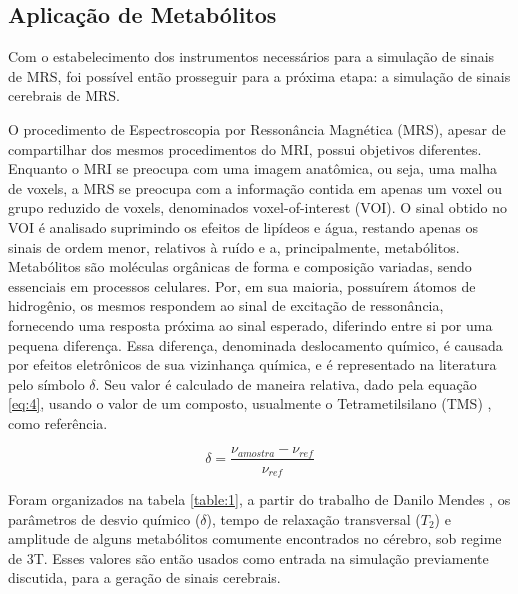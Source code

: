 \documentclass{article}
\begin{document}
\subsection{Aplicação de Metabólitos}

Com o estabelecimento dos instrumentos necessários para a simulação de sinais de MRS, foi possível então prosseguir para a próxima etapa:
a simulação de sinais cerebrais de MRS.

O procedimento de Espectroscopia por Ressonância Magnética (MRS), apesar de compartilhar dos mesmos procedimentos do MRI, possui objetivos 
diferentes. Enquanto o MRI se preocupa com uma imagem anatômica, ou seja, uma malha de voxels, a MRS se preocupa com a informação contida em apenas um voxel ou grupo 
reduzido de voxels, denominados voxel-of-interest (VOI). O sinal obtido no VOI é analisado suprimindo os efeitos de lipídeos e água, restando 
apenas os sinais de ordem menor, relativos à ruído e a, principalmente, metabólitos. Metabólitos são moléculas orgânicas de forma e composição 
variadas, sendo essenciais em processos celulares. Por, em sua maioria, possuírem átomos de hidrogênio, os mesmos respondem ao sinal de excitação 
de ressonância, fornecendo uma resposta próxima ao sinal esperado, diferindo entre si por uma pequena diferença. Essa diferença, denominada deslocamento químico, 
é causada por efeitos eletrônicos de sua vizinhança química, e é representado na literatura pelo símbolo $\delta$. Seu valor é calculado de maneira 
relativa, dado pela equação \ref{eq:4}, usando o valor de um composto, usualmente o Tetrametilsilano (TMS) \cite{}, como referência.

\begin{equation} \label{eq:4}
    \delta = \frac{\nu _{amostra} - \nu _{ref}}{\nu _{ref}}
\end{equation}


Foram organizados na tabela \ref{table:1}, a partir do trabalho de Danilo Mendes \cite{Silva2020-io}, os parâmetros de desvio químico ($\delta$), tempo de relaxação 
transversal ($T_2$) e amplitude de alguns metabólitos comumente encontrados no cérebro, sob regime de 3T. Esses valores são então usados como entrada na simulação
previamente discutida, para a geração de sinais cerebrais. 
\end{document}
